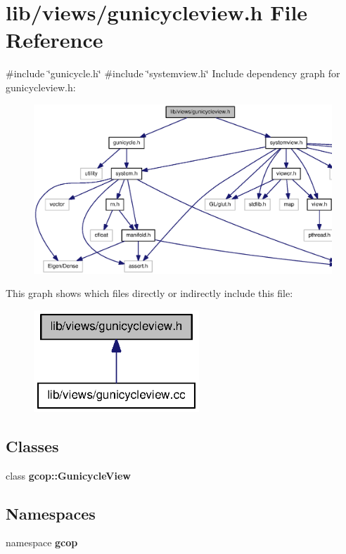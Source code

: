 \section{lib/views/gunicycleview.h \-File \-Reference}
\label{gunicycleview_8h}
{\ttfamily \#include \char`\"{}gunicycle.\-h\char`\"{}}\*
{\ttfamily \#include \char`\"{}systemview.\-h\char`\"{}}\*
\-Include dependency graph for gunicycleview.\-h\-:
\nopagebreak
\begin{figure}[H]
\begin{center}
\leavevmode
\includegraphics[width=350pt]{gunicycleview_8h__incl}
\end{center}
\end{figure}
\-This graph shows which files directly or indirectly include this file\-:
\nopagebreak
\begin{figure}[H]
\begin{center}
\leavevmode
\includegraphics[width=176pt]{gunicycleview_8h__dep__incl}
\end{center}
\end{figure}
\subsection*{\-Classes}
\begin{DoxyCompactItemize}
\item 
class {\bf gcop\-::\-Gunicycle\-View}
\end{DoxyCompactItemize}
\subsection*{\-Namespaces}
\begin{DoxyCompactItemize}
\item 
namespace {\bf gcop}
\end{DoxyCompactItemize}
